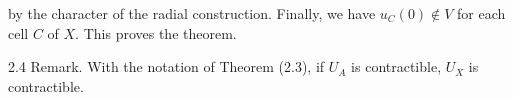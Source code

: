by the character of the radial construction. Finally, we have $u_C(0) \notin V$ for each cell $C$ of $X$. This proves the theorem.

2.4 Remark. With the notation of Theorem (2.3), if $U_A$ is contractible, $U_X$ is contractible.
